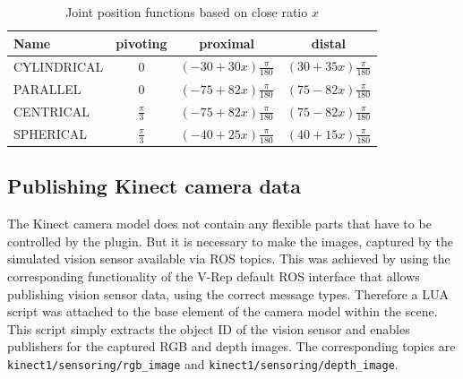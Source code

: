 \begin{table}[h]
  \centering
  \begin{tabular}{|l|c|c|c|} \hline
	\textbf{Name} & \textbf{pivoting} & \textbf{proximal} & \textbf{distal} \\ \hline
	CYLINDRICAL & $0$ & $(-30+30x)\frac{\pi}{180}$ & $(30 + 35x)\frac{\pi}{180}$ \\
	PARALLEL & $0$ & $(-75+82x)\frac{\pi}{180}$ & $(75-82x)\frac{\pi}{180}$ \\
	CENTRICAL & $\frac{\pi}{3}$ & $(-75+82x)\frac{\pi}{180}$ & $(75-82x)\frac{\pi}{180}$ \\
	SPHERICAL & $\frac{\pi}{3}$ & $(-40+25x)\frac{\pi}{180}$ & $(40+15x)\frac{\pi}{180}$ \\ \hline
  \end{tabular}
  \caption{Joint position functions based on close ratio $x$}
  \label{fig:grasp_defs}
\end{table}

\subsection{Publishing Kinect camera data}

The Kinect camera model does not contain any flexible parts that have to be controlled by the plugin. But it is necessary to make the images, captured by the simulated vision sensor available via ROS topics. This was achieved by using the corresponding functionality of the V-Rep default ROS interface that allows publishing vision sensor data, using the correct message types. Therefore a LUA script was attached to the base element of the camera model within the scene. This script simply extracts the object ID of the vision sensor and enables publishers for the captured RGB and depth images. The corresponding topics are \texttt{kinect1/sensoring/rgb\_image} and \texttt{kinect1/sensoring/depth\_image}. 
